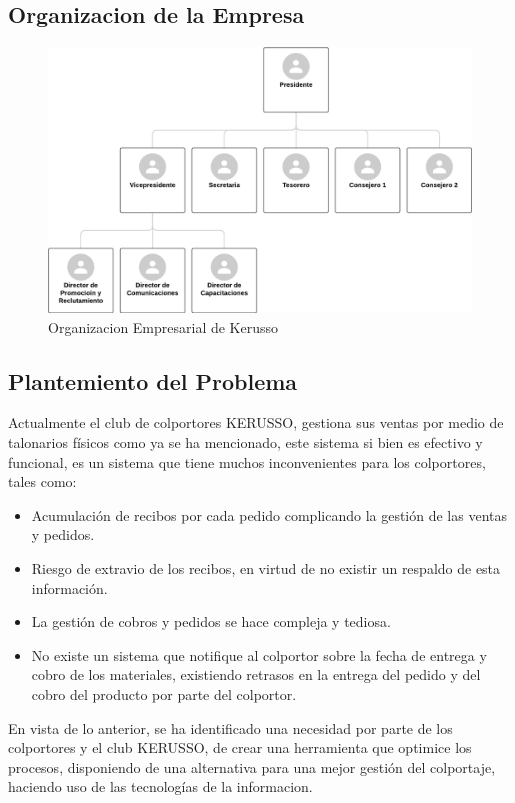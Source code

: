 \documentclass[runningheads]{llncs}
\begin{document}
\subsection{Organizacion  de la Empresa}
\begin{figure}[H]
	\centering\captionsetup{width=0.8\textwidth}
	\includegraphics[width=1\textwidth]{figures/Organigrama.png}
	\caption{Organizacion Empresarial de Kerusso} \label{fig1}
\end{figure}


\subsection{Plantemiento del Problema}
Actualmente el club de colportores KERUSSO, gestiona sus ventas por medio de talonarios físicos como ya se ha mencionado, este sistema si bien es efectivo y funcional, es un sistema que tiene muchos inconvenientes para los colportores, tales como:
\begin{itemize}
    \item Acumulación de recibos por cada pedido complicando la gestión de las ventas y pedidos. 
    \item Riesgo de extravio de los recibos, en virtud de no existir un respaldo de esta información.
    \item La gestión de cobros y pedidos se hace compleja y tediosa.
    \item No existe un sistema que notifique al colportor sobre la fecha de entrega y cobro de los materiales, existiendo retrasos en la entrega del pedido y del cobro del producto por parte del colportor.
\end{itemize}
En vista de lo anterior, se ha identificado una necesidad por parte de los colportores y el club KERUSSO, de crear una herramienta que optimice los procesos, disponiendo de una alternativa para una mejor gestión del colportaje, haciendo uso de las tecnologías de la informacion.
\end{document}
